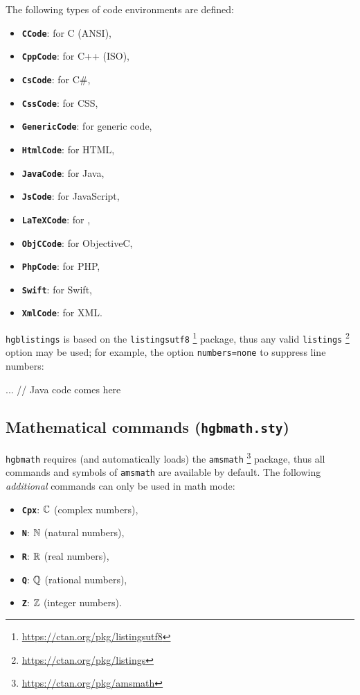 \documentclass[english]{hgbarticle}
\begin{document}
The following types of code environments are defined:%
%
\begin{itemize}
\item \textbf{\texttt{CCode}}: for C (ANSI),
\item \textbf{\texttt{CppCode}}: for C++ (ISO),
\item \textbf{\texttt{CsCode}}: for C\#,
\item \textbf{\texttt{CssCode}}: for CSS,
\item \textbf{\texttt{GenericCode}}: for generic code,
\item \textbf{\texttt{HtmlCode}}: for HTML,
\item \textbf{\texttt{JavaCode}}: for Java,
\item \textbf{\texttt{JsCode}}: for JavaScript,
\item \textbf{\texttt{LaTeXCode}}: for \latex,
\item \textbf{\texttt{ObjCCode}}: for ObjectiveC,
\item \textbf{\texttt{PhpCode}}: for PHP,
\item \textbf{\texttt{Swift}}: for Swift,
\item \textbf{\texttt{XmlCode}}: for XML.
\end{itemize}
%
\texttt{hgblistings} is based on the \texttt{listingsutf8}%
\footnote{\url{https://ctan.org/pkg/listingsutf8}}
package, thus any valid \texttt{listings}%
\footnote{\url{https://ctan.org/pkg/listings}}
option may be used; for example, 
the option \texttt{numbers=none} to suppress line numbers:
\begin{LaTeXCode}[numbers=none]
    \begin{JavaCode}[numbers=none]
    ... // Java code comes here
    \end{JavaCode}
\end{LaTeXCode}



\subsection{Mathematical commands (\texttt{hgbmath.sty})}

\texttt{hgbmath} requires (and automatically loads) the \texttt{amsmath}%
\footnote{\url{https://ctan.org/pkg/amsmath}}
package, thus all
commands and symbols of \texttt{amsmath} are available by default.
The following \emph{additional} commands can only be used in math mode:
%
\begin{itemize}
\item \textbf{\texttt{{\bs}Cpx}}: $\mathbb{C}$ (complex numbers),
\item \textbf{\texttt{{\bs}N}}: $\mathbb{N}$ (natural numbers),
\item \textbf{\texttt{{\bs}R}}: $\mathbb{R}$ (real numbers),
\item \textbf{\texttt{{\bs}Q}}: $\mathbb{Q}$ (rational numbers),
\item \textbf{\texttt{{\bs}Z}}: $\mathbb{Z}$ (integer numbers).
\end{itemize}
\end{document}
